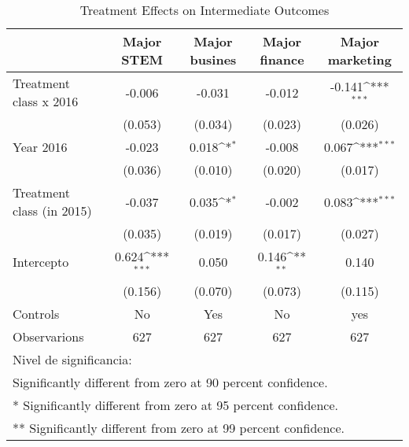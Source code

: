\begin{table}[]
\caption{Treatment Effects on Intermediate Outcomes}
{
\def\sym#1{\ifmmode^{#1}\else\(^{#1}\)\fi}
\begin{tabular}{@{\extracolsep{2pt}}l*{4}{c}@{}}
\hline\hline


 & Major STEM & Major busines & Major finance & Major marketing \\
\hline
Treatment class x 2016 & -0.006 & -0.031 & -0.012 & -0.141\sym{***} \\
 & (0.053) & (0.034) & (0.023) & (0.026) \\
Year 2016 & -0.023 & 0.018\sym{*} & -0.008 & 0.067\sym{***} \\
 & (0.036) & (0.010) & (0.020) & (0.017) \\
Treatment class (in 2015) & -0.037 & 0.035\sym{*} & -0.002 & 0.083\sym{***} \\
 & (0.035) & (0.019) & (0.017) & (0.027) \\
Intercepto & 0.624\sym{***} & 0.050 & 0.146\sym{**} & 0.140 \\
 & (0.156) & (0.070) & (0.073) & (0.115) \\
Controls & No & Yes & No & yes \\

\hline
Observarions & 627 & 627 & 627 & 627 \\
\hline\hline
\multicolumn{5}{l}{\footnotesize Nivel de significancia:}\vspace{-.25em} \\
\multicolumn{5}{l}{\footnotesize * Significantly different from zero at 90 percent confidence.}\vspace{-.25em} \\
\multicolumn{5}{l}{\footnotesize ** Significantly different from zero at 95 percent confidence.}\vspace{-.25em} \\
\multicolumn{5}{l}{\footnotesize *** Significantly different from zero at 99 percent confidence.}
\end{tabular}
}
\end{table}